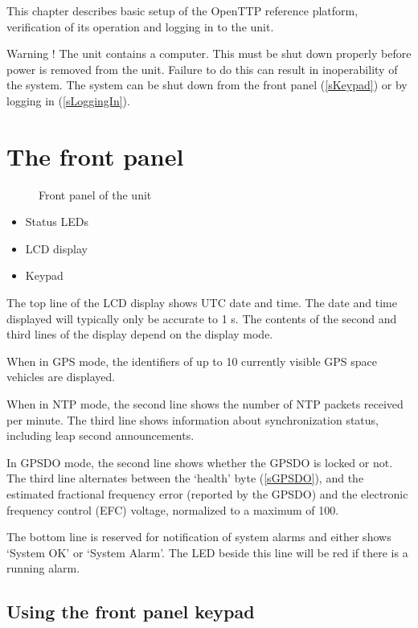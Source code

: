 
This chapter describes basic setup of the OpenTTP reference  platform, verification of its operation and logging in to the unit.

Warning !
The  unit contains a computer. This must be shut down properly
before power is removed from the unit. Failure to do this can 
result in inoperability of the system.
The system can be shut down from the front panel (\ref{sKeypad}) or by
logging in (\ref{sLoggingIn}).


\section{The front panel \label{sFrontPanel}}

\begin{figure}[h]
\caption{Front panel of the unit}
\end{figure}

\begin{itemize}
	\item[\mykey{A}] Status LEDs
	\item[\mykey{B}] LCD display
	\item[\mykey{C}] Keypad
\end{itemize}

The top line of the LCD display shows UTC date and time.
The date and time displayed will typically only be accurate to 1 s.
The contents of the second and third lines of the display depend on the display mode.

When in GPS mode, the identifiers of up
to 10 currently visible GPS space vehicles are displayed. 

When in NTP mode, the second line shows
the number of NTP packets received per minute. The third line shows information about
synchronization status, including leap second announcements.

In GPSDO mode, the second line shows whether the GPSDO is locked or not. 
The third line alternates between the `health' byte (\ref{sGPSDO}), and the estimated fractional frequency error 
(reported by the GPSDO) and the electronic frequency control (EFC) voltage, normalized to a maximum of 100.

The bottom line is reserved for notification of system alarms and either shows
`System OK' or `System Alarm'.
The LED beside this line will be red if there is a running alarm.

\subsection{Using the front panel keypad \label{sKeypad} }

